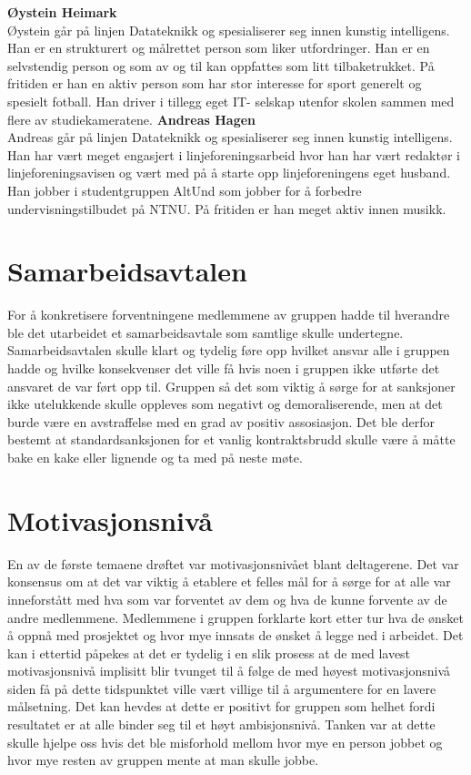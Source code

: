 \documentclass[a4paper,norsk,oneside]{article}
\begin{document}
\textbf{Øystein Heimark}\\
Øystein går på linjen Datateknikk og spesialiserer seg innen kunstig intelligens. Han er en strukturert og målrettet person som liker utfordringer. Han er en selvstendig person og som av og til kan oppfattes som litt tilbaketrukket. På fritiden er han en aktiv person som har stor interesse for sport generelt og spesielt fotball. Han driver i tillegg eget IT- selskap utenfor skolen sammen med flere av studiekameratene.
\newline
\newline
\textbf{Andreas Hagen}\\
Andreas går på linjen Datateknikk og spesialiserer seg innen kunstig intelligens. Han har vært meget engasjert i linjeforeningsarbeid hvor han har vært redaktør i linjeforeningsavisen og vært med på å starte opp linjeforeningens eget husband. Han jobber i studentgruppen AltUnd som jobber for å forbedre undervisningstilbudet på NTNU. På fritiden er han meget aktiv innen musikk.


\section{Samarbeidsavtalen}
For å konkretisere forventningene medlemmene av gruppen hadde til hverandre ble det utarbeidet et samarbeidsavtale som samtlige skulle undertegne. Samarbeidsavtalen skulle klart og tydelig føre opp hvilket ansvar alle i gruppen hadde og hvilke konsekvenser det ville få hvis noen i gruppen ikke utførte det ansvaret de var ført opp til. Gruppen så det som viktig å sørge for at sanksjoner ikke utelukkende skulle oppleves som negativt og demoraliserende, men at det burde være en avstraffelse med en grad av positiv assosiasjon. Det ble derfor bestemt at standardsanksjonen for et vanlig kontraktsbrudd skulle være å måtte bake en kake eller lignende og ta med på neste møte.

\section{Motivasjonsnivå}
En av de første temaene drøftet var motivasjonsnivået blant deltagerene. Det var konsensus om at det var viktig å etablere et felles mål for å sørge for at alle var inneforstått med hva som var forventet av dem og hva de kunne forvente av de andre medlemmene. Medlemmene i gruppen forklarte kort etter tur hva de ønsket å oppnå med prosjektet og hvor mye innsats de ønsket å legge ned i arbeidet. Det kan i ettertid påpekes at det er tydelig i en slik prosess at de med lavest motivasjonsnivå implisitt blir tvunget til å følge de med høyest motivasjonsnivå siden få på dette tidspunktet ville vært villige til å argumentere for en lavere målsetning. Det kan hevdes at dette er positivt for gruppen som helhet fordi resultatet er at alle binder seg til et høyt ambisjonsnivå. Tanken var at dette skulle hjelpe oss hvis det ble misforhold mellom hvor mye en person jobbet og hvor mye resten av gruppen mente at man skulle jobbe.
	
\end{document}
